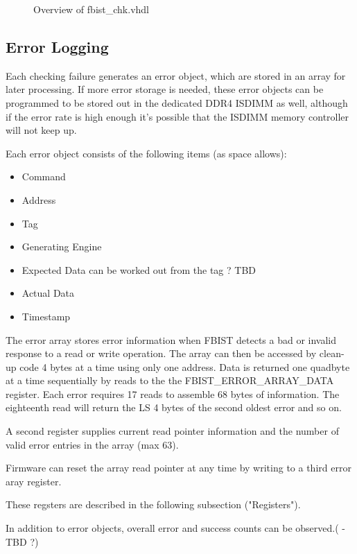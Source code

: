 \begin{figure}[h]
  \begin{center}
    
  \end{center}
  \caption[Overview of fbist\_chk.vhdl]{\label{fig:fbist_chk}Overview of fbist\_chk.vhdl
  }
\end{figure}

\subsection{Error Logging}
Each checking failure generates an error object, which are stored in
an array for later processing. If more error storage is needed, these
error objects can be programmed to be stored out in the dedicated DDR4
ISDIMM as well, although if the error rate is high enough it's
possible that the ISDIMM memory controller will not keep up.

Each error object consists of the following items (as space allows):
\begin{itemize}
  \item Command
  \item Address
  \item Tag
  \item Generating Engine
  \item Expected Data can be worked out from the tag ? TBD
  \item Actual Data
  \item Timestamp
\end{itemize}

The error array stores error information when FBIST detects a bad or
invalid response to a read or write operation. The array can then be
accessed by clean-up code 4 bytes at a time using only one address.
Data is returned one quadbyte at a time
sequentially by reads to the the FBIST\_ERROR\_ARRAY\_DATA register. Each error requires
17 reads to assemble 68 bytes of information. The eighteenth read
will return the LS 4 bytes of the second oldest error and so on.

A second register supplies current read pointer information and the
number of valid error entries in the array (max 63).

Firmware can reset the array read pointer at any time by writing to
a third error aray register.

These regsters are described in the following subsection ("Registers").


In addition to error objects, overall error and success counts can be
observed.( - TBD ?)

